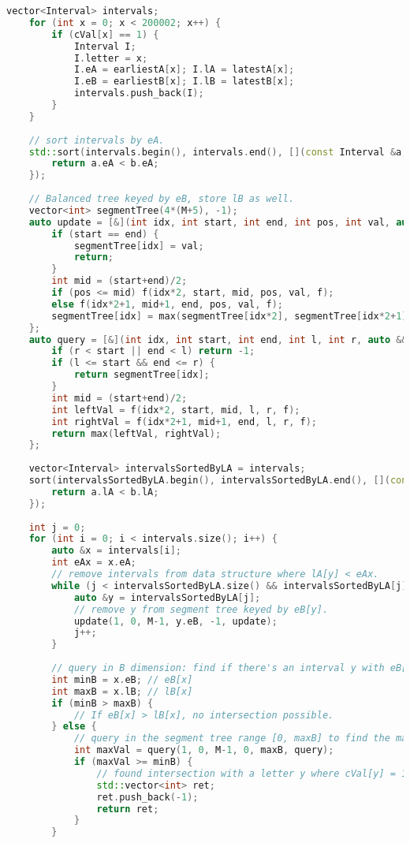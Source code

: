 \begin{lstlisting}[language=C++]
    vector<Interval> intervals;
    for (int x = 0; x < 200002; x++) {
        if (cVal[x] == 1) {
            Interval I;
            I.letter = x;
            I.eA = earliestA[x]; I.lA = latestA[x];
            I.eB = earliestB[x]; I.lB = latestB[x];
            intervals.push_back(I);
        }
    }
 
    // sort intervals by eA.
    std::sort(intervals.begin(), intervals.end(), [](const Interval &a, const Interval &b){
        return a.eA < b.eA;
    });
 
    // Balanced tree keyed by eB, store lB as well.
    vector<int> segmentTree(4*(M+5), -1);
    auto update = [&](int idx, int start, int end, int pos, int val, auto &&f) -> void {
        if (start == end) {
            segmentTree[idx] = val;
            return;
        }
        int mid = (start+end)/2;
        if (pos <= mid) f(idx*2, start, mid, pos, val, f);
        else f(idx*2+1, mid+1, end, pos, val, f);
        segmentTree[idx] = max(segmentTree[idx*2], segmentTree[idx*2+1]);
    };
    auto query = [&](int idx, int start, int end, int l, int r, auto &&f) -> int {
        if (r < start || end < l) return -1;
        if (l <= start && end <= r) {
            return segmentTree[idx];
        }
        int mid = (start+end)/2;
        int leftVal = f(idx*2, start, mid, l, r, f);
        int rightVal = f(idx*2+1, mid+1, end, l, r, f);
        return max(leftVal, rightVal);
    };
 
    vector<Interval> intervalsSortedByLA = intervals;
    sort(intervalsSortedByLA.begin(), intervalsSortedByLA.end(), [](const Interval &a, const Interval &b){
        return a.lA < b.lA;
    });
 
    int j = 0;
    for (int i = 0; i < intervals.size(); i++) {
        auto &x = intervals[i];
        int eAx = x.eA;
        // remove intervals from data structure where lA[y] < eAx.
        while (j < intervalsSortedByLA.size() && intervalsSortedByLA[j].lA < eAx) {
            auto &y = intervalsSortedByLA[j];
            // remove y from segment tree keyed by eB[y].
            update(1, 0, M-1, y.eB, -1, update);
            j++;
        }
 
        // query in B dimension: find if there's an interval y with eB[y] <= lB[x] and lB[y] >= eB[x].
        int minB = x.eB; // eB[x]
        int maxB = x.lB; // lB[x]
        if (minB > maxB) {
            // If eB[x] > lB[x], no intersection possible.
        } else {
            // query in the segment tree range [0, maxB] to find the maximum lB[y].
            int maxVal = query(1, 0, M-1, 0, maxB, query);
            if (maxVal >= minB) {
                // found intersection with a letter y where cVal[y] = 1.
                std::vector<int> ret;
                ret.push_back(-1);
                return ret;
            }
        }
 

\end{lstlisting}
